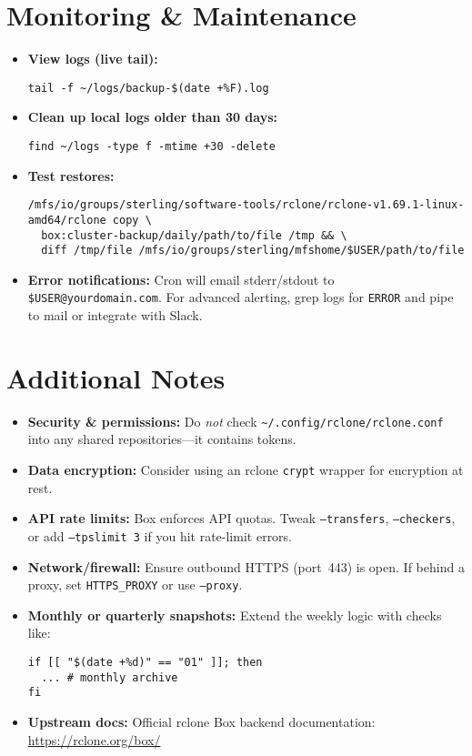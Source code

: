 \documentclass[12pt,letterpaper]{article}
\begin{document}
\section{Monitoring \& Maintenance}
\begin{itemize}
  \item \textbf{View logs (live tail):}
    \begin{lstlisting}[style=custombash]
tail -f ~/logs/backup-$(date +%F).log
    \end{lstlisting}
  \item \textbf{Clean up local logs older than 30 days:}
    \begin{lstlisting}[style=custombash]
find ~/logs -type f -mtime +30 -delete
    \end{lstlisting}
  \item \textbf{Test restores:}
    \begin{lstlisting}[style=custombash]
/mfs/io/groups/sterling/software-tools/rclone/rclone-v1.69.1-linux-amd64/rclone copy \
  box:cluster-backup/daily/path/to/file /tmp && \
  diff /tmp/file /mfs/io/groups/sterling/mfshome/$USER/path/to/file
    \end{lstlisting}
  \item \textbf{Error notifications:} Cron will email stderr/stdout to \verb|$USER@yourdomain.com|. For advanced alerting, grep logs for \texttt{ERROR} and pipe to mail or integrate with Slack.
\end{itemize}

\section{Additional Notes}
\begin{itemize}
  \item \textbf{Security \& permissions:}
    Do \emph{not} check \verb|~/.config/rclone/rclone.conf| into any shared repositories—it contains tokens.
  \item \textbf{Data encryption:}
    Consider using an rclone \texttt{crypt} wrapper for encryption at rest.
  \item \textbf{API rate limits:}
    Box enforces API quotas. Tweak \texttt{--transfers}, \texttt{--checkers}, or add \texttt{--tpslimit 3} if you hit rate-limit errors.
  \item \textbf{Network/firewall:}
    Ensure outbound HTTPS (port~443) is open. If behind a proxy, set \verb|HTTPS_PROXY| or use \texttt{--proxy}.
  \item \textbf{Monthly or quarterly snapshots:}
    Extend the weekly logic with checks like:
    \begin{lstlisting}[style=custombash]
if [[ "$(date +%d)" == "01" ]]; then
  ... # monthly archive
fi
    \end{lstlisting}
  \item \textbf{Upstream docs:}
    Official rclone Box backend documentation:
    \href{https://rclone.org/box/}{https://rclone.org/box/}
\end{itemize}
\end{document}
